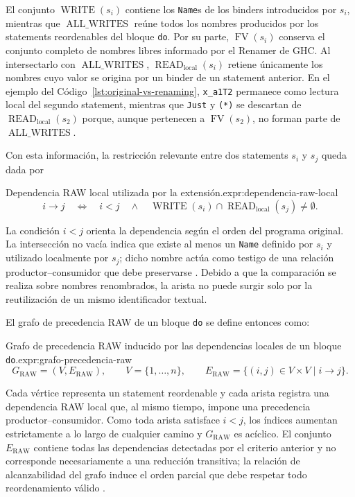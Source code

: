 El conjunto $\operatorname{WRITE}(s_i)$ contiene los \texttt{Name}s de los binders introducidos por $s_i$, mientras que $\operatorname{ALL\_WRITES}$ reúne todos los nombres producidos por los statements reordenables del bloque \texttt{do}. Por su parte, $\operatorname{FV}(s_i)$ conserva el conjunto completo de nombres libres informado por el Renamer de \textsf{GHC}. Al intersectarlo con $\operatorname{ALL\_WRITES}$, $\operatorname{READ}_{\mathrm{local}}(s_i)$ retiene únicamente los nombres cuyo valor se origina por un binder de un statement anterior. En el ejemplo del Código~\ref{lst:original-vs-renaming}, \texttt{x\_a1T2} permanece como lectura local del segundo statement, mientras que \texttt{Just} y \verb|(*)| se descartan de $\operatorname{READ}_{\mathrm{local}}(s_2)$ porque, aunque pertenecen a $\operatorname{FV}(s_2)$, no forman parte de $\operatorname{ALL\_WRITES}$.

Con esta información, la restricción relevante entre dos statements $s_i$ y $s_j$ queda dada por

\begin{ReportExpression}{Dependencia RAW local utilizada por la extensión.}{expr:dependencia-raw-local}
\[
i\longrightarrow j
\quad\iff\quad
i<j
\quad\land\quad
\operatorname{WRITE}(s_i)
\cap
\operatorname{READ}_{\mathrm{local}}(s_j)
\neq\emptyset.
\]
\end{ReportExpression}

La condición $i<j$ orienta la dependencia según el orden del programa original. La intersección no vacía indica que existe al menos un \texttt{Name} definido por $s_i$ y utilizado localmente por $s_j$; dicho nombre actúa como testigo de una relación productor--consumidor que debe preservarse \cite{HarroldSoffa1994}. Debido a que la comparación se realiza sobre nombres renombrados, la arista no puede surgir solo por la reutilización de un mismo identificador textual.

El grafo de precedencia RAW de un bloque \texttt{do} se define entonces como:

\begin{ReportExpression}{Grafo de precedencia RAW inducido por las dependencias locales de un bloque \texttt{do}.}{expr:grafo-precedencia-raw}
\[
G_{\mathrm{RAW}}=(V,E_{\mathrm{RAW}}),
\qquad
V=\{1,\ldots,n\},
\qquad
E_{\mathrm{RAW}}=\{(i,j)\in V\times V\mid i\longrightarrow j\}.
\]
\end{ReportExpression}

Cada vértice representa un statement reordenable y cada arista registra una dependencia RAW local que, al mismo tiempo, impone una precedencia productor--consumidor. Como toda arista satisface $i<j$, los índices aumentan estrictamente a lo largo de cualquier camino y $G_{\mathrm{RAW}}$ es acíclico. El conjunto $E_{\mathrm{RAW}}$ contiene todas las dependencias detectadas por el criterio anterior y no corresponde necesariamente a una reducción transitiva; la relación de alcanzabilidad del grafo induce el orden parcial que debe respetar todo reordenamiento válido \cite{Pratt1986}.

